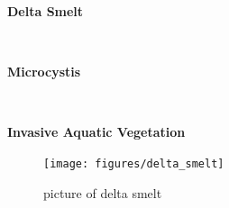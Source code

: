 \documentclass[
]{book}
\begin{document}
\begin{panel-grid}

\begin{columns-nocenter}

\begin{column800}

\textbf{Delta Smelt}

\end{column800}

\begin{column40}

~

\end{column40}

\begin{column800}

\textbf{Microcystis}

\end{column800}

\begin{column40}

~

\end{column40}

\begin{column800}

\textbf{Invasive Aquatic Vegetation}

\end{column800}

\end{columns-nocenter}

\begin{columns-nocenter}

\begin{column800}

\begin{figure}

{\centering \texttt{[image: figures/delta\_smelt]} 

}

\caption{picture of delta smelt}\label{fig:unnamed-chunk-85}
\end{figure}

\end{column800}

\begin{column40}

~

\end{column40}

\begin{column800}

\begin{figure}


\end{figure}
\end{column800}
\end{columns-nocenter}
\end{panel-grid}
\end{document}
